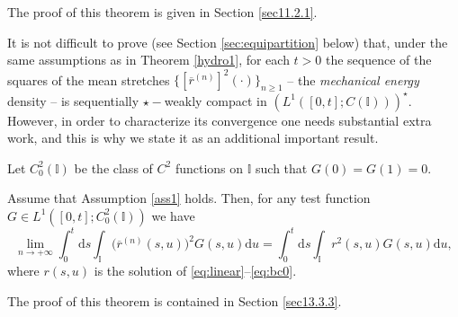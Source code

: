 \documentclass[EJP]{ejpecp} %
\newcommand\T{{\mathbb I}}
\renewcommand{\ge}{\geqslant}
\newcommand{\dd  }{\mathrm{d}}
\renewcommand{\hat}{\widehat}
\renewcommand{\bar}{\overline}
\numberwithin{equation}{section}
\begin{document}
 
The proof of this theorem is given in Section \ref{sec11.2.1}.


It is not difficult to prove (see Section \ref{sec:equipartition}
below) that, under the same assumptions as in Theorem \ref{hydro1}, for
each $t>0$ the sequence of the squares of the mean stretches
$\{[\bar r^{(n)}]^2 (\cdot)\}_{n\ge1}$ -- the
\emph{mechanical energy} density -- is sequentially $\star-$weakly
compact in $\left(L^1([0,t];C(\T))\right)^\star$. 
However, in order to characterize its convergence
one needs substantial extra work, and this is why we state it as an additional important  result.


Let $C_{0}^2(\T)$ be  the class of
$C^2$ functions  on $\T$ such that $G(0) = G(1) =
0$.

\begin{theorem}
\label{hydro2}
Assume that  Assumption \ref{ass1} holds. 
Then, for any  test function $G\in
L^1([0,t];C_{0}^2(\T))$ we have
\begin{equation}
\label{060401-20x}
\lim_{n\to+\infty}\int_0^{t}\dd s\int_\T\big(\bar
r^{(n)} (s,u)\big)^2G(s,u)\dd u= \int_0^{t}\dd s\int_\T
r^2 (s,u)G(s,u)\dd u,
\end{equation}
where $r(s,u)$ is the solution of \eqref{eq:linear}--\eqref{eq:bc0}.
\end{theorem}
The proof of this theorem is contained in Section \ref{sec13.3.3}.
\end{document}
